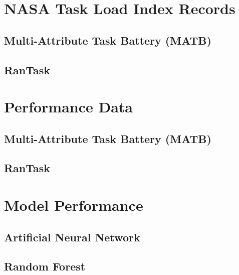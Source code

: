 \documentclass[11pt]{article}
\begin{document}
\newpage


\pagebreak
\begin{appendices}
\appendixpage
\noappendicestocpagenum
\addappheadtotoc
\section{NASA Task Load Index Records}
	\subsection{Multi-Attribute Task Battery (MATB)}
	\subsection{RanTask}
\section{Performance Data}
	\subsection{Multi-Attribute Task Battery (MATB)}
	\subsection{RanTask}
\section{Model Performance}
	\subsection{Artificial Neural Network}
	\subsection{Random Forest}
\end{appendices}	
\end{document}
